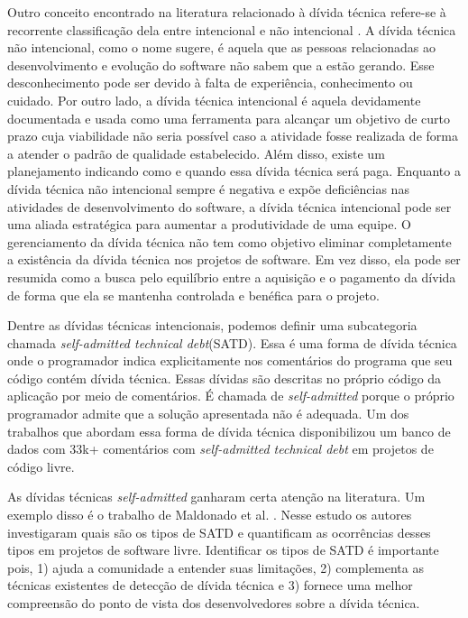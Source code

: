 Outro conceito encontrado na literatura relacionado à dívida técnica refere-se à recorrente classificação dela entre intencional e não intencional \cite{sterling2010managing,brown2010managing,klinger2011enterprise}. A dívida técnica não intencional, como o nome sugere, é aquela que as pessoas relacionadas ao desenvolvimento e evolução do software não sabem que a estão gerando. Esse desconhecimento pode ser devido à falta de experiência, conhecimento ou cuidado. Por outro lado, a dívida técnica intencional é aquela devidamente documentada e usada como uma ferramenta para alcançar um objetivo de curto prazo cuja viabilidade não seria possível caso a atividade fosse realizada de forma a atender o padrão de qualidade estabelecido.  Além disso, existe um planejamento indicando como e quando essa dívida técnica será paga. Enquanto a dívida técnica não intencional sempre é negativa e expõe deficiências nas atividades de desenvolvimento do software, a dívida técnica intencional pode ser uma aliada estratégica para aumentar a produtividade de uma equipe. O gerenciamento da dívida técnica não tem como objetivo eliminar completamente a existência da dívida técnica nos projetos de software. Em vez disso, ela pode ser resumida como a busca pelo equilíbrio entre a aquisição e o pagamento da dívida de forma que ela se mantenha controlada e benéfica para o projeto. 

Dentre as dívidas técnicas intencionais, podemos definir uma subcategoria chamada \textit{self-admitted technical debt}(SATD). Essa é uma forma de dívida técnica onde o programador indica explicitamente nos comentários do programa que seu código contém dívida técnica. Essas dívidas são descritas no próprio código da aplicação por meio de comentários. É chamada de \textit{self-admitted} porque o próprio programador admite que a solução apresentada não é adequada. Um dos trabalhos que abordam essa forma de dívida técnica\cite{maldonado2015detecting} disponibilizou um banco de dados com  33k+ comentários com \textit{self-admitted technical debt} em projetos de código livre.


As dívidas técnicas \textit{self-admitted} ganharam certa atenção na literatura. Um exemplo disso é o trabalho de Maldonado et al.  \cite{maldonado2015detecting}. Nesse estudo os autores  investigaram quais são os tipos de SATD e quantificam as ocorrências desses tipos em projetos de software livre. Identificar os tipos de SATD  é importante pois, 1) ajuda a comunidade a entender suas limitações, 2) complementa as técnicas existentes de detecção de dívida técnica e 3) fornece uma melhor compreensão do ponto de vista dos desenvolvedores sobre a dívida técnica. 

